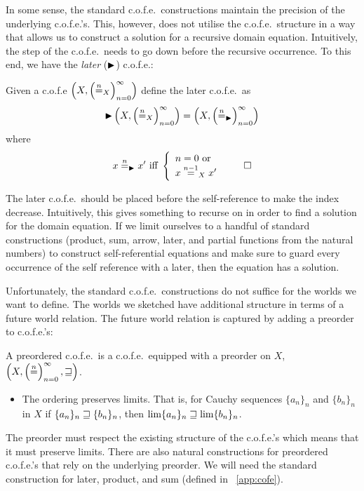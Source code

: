 \begin{jversion}
In some sense, the standard c.o.f.e.\ constructions maintain the precision of the underlying c.o.f.e.'s.
This, however, does not utilise the c.o.f.e.\ structure in a way that allows us to construct a solution for a recursive domain equation.
Intuitively, the step of the c.o.f.e.\ needs to go down before the recursive occurrence.
To this end, we have the \emph{later} ($\blater$) c.o.f.e.:
\begin{lemma}[$\blater$ c.o.f.e.]
  \label{def:later-cofe}
  Given a c.o.f.e $\left(X, \left(\nequal_X\right)_{n=0}^{\infty} \right)$ define the later c.o.f.e.\ as
  \[
    \blater\left(X, \left(\nequal_X\right)_{n=0}^{\infty} \right) = \left(X, \left(\nequal[n]_{\blater}\right)_{n=0}^{\infty} \right)
  \]
  where
  \[
    x \nequal[n]_{\blater} x' \text{ iff } \left\{
      \begin{array}{l}
        n = 0 \text{ or }\\
        x \nequal[n-1]_X x'
      \end{array}
    \right. \qedhere
  \]
\end{lemma}
The later c.o.f.e.\ should be placed before the self-reference to make the index decrease. 
Intuitively, this gives something to recurse on in order to find a solution for the domain equation.
If we limit ourselves to a handful of standard constructions (product, sum, arrow, later, and partial functions from the natural numbers) to construct self-referential equations and make sure to guard every occurrence of the self reference with a later, then the equation has a solution.

Unfortunately, the standard c.o.f.e.\ constructions do not suffice for the worlds we want to define.
The worlds we sketched have additional structure in terms of a future world relation.
The future world relation is captured by adding a preorder to c.o.f.e.'s:
\begin{definition}[Preordered c.o.f.e.]
  A preordered c.o.f.e.\ is a c.o.f.e.\ equipped with a preorder on $X$, $\left(X, \left(\nequal\right)_{n=0}^{\infty}, \future \right)$. 
  \begin{itemize}
  \item The ordering preserves limits. That is, for Cauchy sequences $\{a_n\}_n$ and $\{b_n\}_n$ in $X$ if $\{a_n\}_n \future\{b_n\}_n$, then $\lim \{a_n\}_n \future \lim \{b_n\}_n$.
  \end{itemize}
\end{definition}
The preorder must respect the existing structure of the c.o.f.e.'s which means that it must preserve limits.
There are also natural constructions for preordered c.o.f.e.'s that rely on the underlying preorder.
We will need the standard construction for later, product, and sum (defined in \appendixname~\ref{app:cofe}).


\end{jversion}
